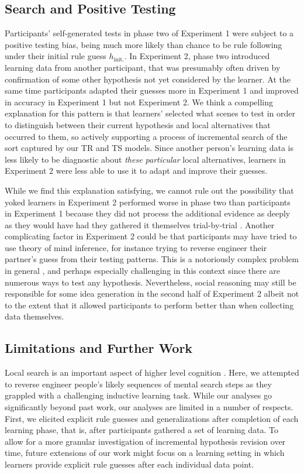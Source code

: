 \documentclass[doc,natbib,floatsintext]{apa7}
\newcommand{\hi}{h_{\mathrm{init.}}}
\begin{document}
\subsection{Search and Positive Testing}
Participants' self-generated tests in phase two of Experiment 1 were subject to a positive testing bias, being much more likely than chance to be rule following under their initial rule guess $\hi$. In Experiment 2, phase two introduced learning data from another participant, that was presumably often driven by confirmation of some other hypothesis not yet considered by the learner. At the same time participants adapted their guesses more in Experiment 1 and improved in accuracy in Experiment 1 but not Experiment 2. We think a compelling explanation for this pattern is that learners' selected what scenes to test in order to distinguish between their current hypothesis and local alternatives that occurred to them, so actively supporting a process of incremental search of the sort captured by our TR and TS models. Since another person's learning data is less likely to be diagnostic about \emph{these particular} local alternatives, learners in Experiment 2 were less able to use it to adapt and improve their guesses. 

While we find this explanation satisfying, we cannot rule out the possibility that yoked learners in Experiment 2 performed worse in phase two than participants in Experiment 1 because they did not process the additional evidence as deeply as they would have had they gathered it themselves trial-by-trial \citep{ruggeri2016active}. Another complicating factor in Experiment 2 could be that participants may have tried to use theory of mind inference, for instance trying to reverse engineer their partner's guess from their testing patterns. This is a notoriously complex problem in general \citep{wu2021representational, shafto2012learning,jara2016naive,hawthorne2019reasoning, wu2021representational}, and perhaps especially challenging in this context since there are numerous ways to test any hypothesis. Nevertheless, social reasoning may still be responsible for some idea generation in the second half of Experiment 2 albeit not to the extent that it allowed participants to perform better than when collecting data themselves. 

\subsection{Limitations and Further Work}
Local search is an important aspect of higher level cognition \citep{hart2020creative, hills2008search, hills2015exploration}. Here, we attempted to reverse engineer people's likely sequences of mental search steps as they grappled with a challenging inductive learning task. While our analyses go significantly beyond past work, our analyses are limited in a number of respects. First, we elicited explicit rule guesses and generalizations after completion of each learning phase, that is, after participants gathered a set of learning data. To allow for a more granular investigation of incremental hypothesis revision over time, future extensions of our work might focus on a learning setting in which learners provide explicit rule guesses after each individual data point.
\end{document}
